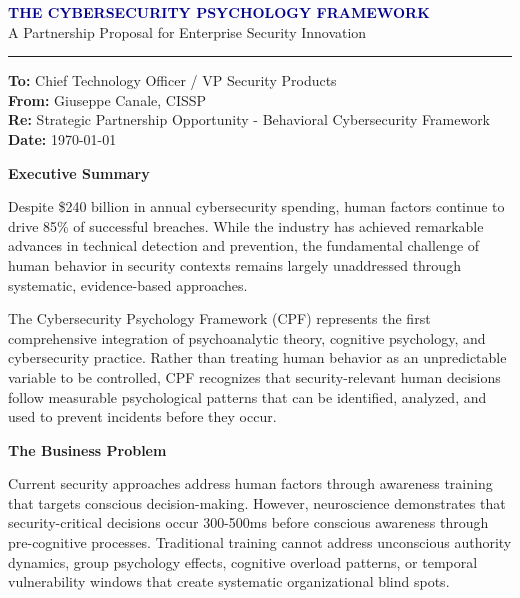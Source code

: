 \documentclass[11pt,a4paper]{article}
\begin{document}
\thispagestyle{empty}

\begin{center}
{\Large \textbf{\textcolor{darkblue}{THE CYBERSECURITY PSYCHOLOGY FRAMEWORK}}}\\[0.2cm]
{\large \textcolor{mediumgray}{A Partnership Proposal for Enterprise Security Innovation}}\\[0.1cm]
\rule{12cm}{0.5pt}
\end{center}

\vspace{1cm}

\textbf{To:} Chief Technology Officer / VP Security Products\\
\textbf{From:} Giuseppe Canale, CISSP\\
\textbf{Re:} Strategic Partnership Opportunity - Behavioral Cybersecurity Framework\\
\textbf{Date:} \today

\vspace{0.8cm}

\textbf{Executive Summary}

Despite \$240 billion in annual cybersecurity spending, human factors continue to drive 85\% of successful breaches. While the industry has achieved remarkable advances in technical detection and prevention, the fundamental challenge of human behavior in security contexts remains largely unaddressed through systematic, evidence-based approaches.

The Cybersecurity Psychology Framework (CPF) represents the first comprehensive integration of psychoanalytic theory, cognitive psychology, and cybersecurity practice. Rather than treating human behavior as an unpredictable variable to be controlled, CPF recognizes that security-relevant human decisions follow measurable psychological patterns that can be identified, analyzed, and used to prevent incidents before they occur.

\textbf{The Business Problem}

Current security approaches address human factors through awareness training that targets conscious decision-making. However, neuroscience demonstrates that security-critical decisions occur 300-500ms before conscious awareness through pre-cognitive processes. Traditional training cannot address unconscious authority dynamics, group psychology effects, cognitive overload patterns, or temporal vulnerability windows that create systematic organizational blind spots.
\end{document}
